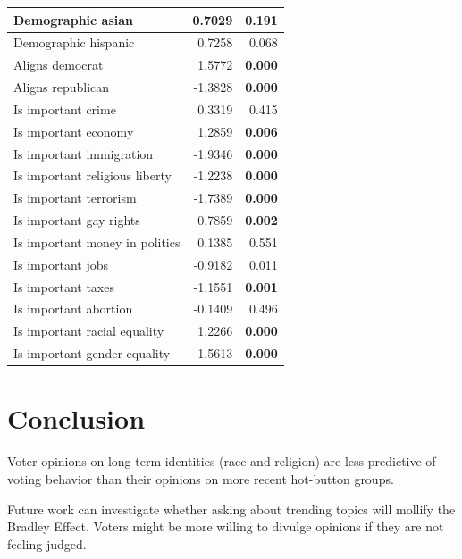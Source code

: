 \documentclass[a0,portrait]{a0poster}
\begin{document}
\begin{multicols}{2}
\begin{center}
{\begin{tabular}{|l|r|r|}
Demographic asian & 0.7029 & 0.191 \\ \hline
Demographic hispanic & 0.7258 & 0.068 \\ \hline
Aligns democrat & 1.5772 & \textbf{0.000} \\ \hline
Aligns republican & -1.3828 & \textbf{0.000} \\ \hline
Is important crime & 0.3319 & 0.415 \\ \hline
Is important economy & 1.2859 &  \textbf{0.006} \\ \hline
Is important immigration & -1.9346 & \textbf{0.000} \\ \hline
Is important religious liberty & -1.2238 & \textbf{0.000} \\ \hline
Is important terrorism & -1.7389 & \textbf{0.000} \\ \hline
Is important gay rights & 0.7859 & \textbf{0.002} \\ \hline
Is important money in politics & 0.1385 & 0.551 \\ \hline
Is important jobs & -0.9182 & 0.011 \\ \hline
Is important taxes & -1.1551 &  \textbf{0.001} \\ \hline
Is important abortion & -0.1409 & 0.496 \\ \hline
Is important racial equality & 1.2266 & \textbf{0.000} \\ \hline
Is important gender equality & 1.5613 & \textbf{0.000} \\ \hline
\end{tabular}}
  \label{fig:coefficients}
\end{center}

\vspace{-1cm}
\section*{Conclusion}

\noindent
Voter opinions on long-term identities (race and religion) are less predictive of voting behavior than their opinions on more recent hot-button groups.

\vspace{0.5cm}
\noindent
Future work can investigate whether asking about trending topics will mollify the Bradley Effect. Voters might be more willing to divulge opinions if they are not feeling judged. 


\end{multicols}
\end{document}
